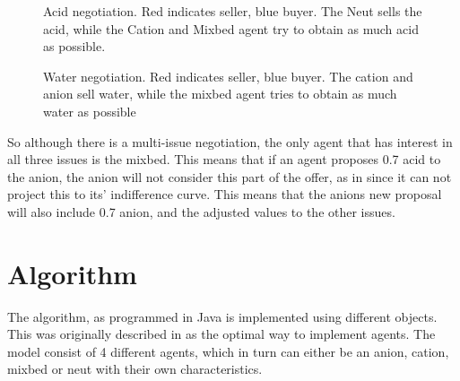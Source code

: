 \begin{figure}[h]
	\centering
	\caption{Acid negotiation. Red indicates seller, blue buyer. The Neut sells the acid, while the Cation and Mixbed agent try to obtain as much acid as possible.}
	\label{fig:agent-plant-acid}
\end{figure}

\begin{figure}[h]
	\centering
	\caption{Water negotiation. Red indicates seller, blue buyer. The cation and anion sell water, while the mixbed agent tries to obtain as much water as possible}
	\label{fig:agent-plant-water}
\end{figure}

So although there is a multi-issue negotiation, the only agent that has interest in all three issues is the mixbed. This means that if an agent proposes 0.7 acid to the anion, the anion will not consider this part of the offer, as in since it can not project this to its' indifference curve. This means that the anions new proposal will also include 0.7 anion, and the adjusted values to the other issues.

\clearpage
\section{Algorithm}
The algorithm, as programmed in Java is implemented using different objects. This was originally described in  as the optimal way to implement agents. The model consist of 4 different agents, which in turn can either be an anion, cation, mixbed or neut with their own characteristics.


